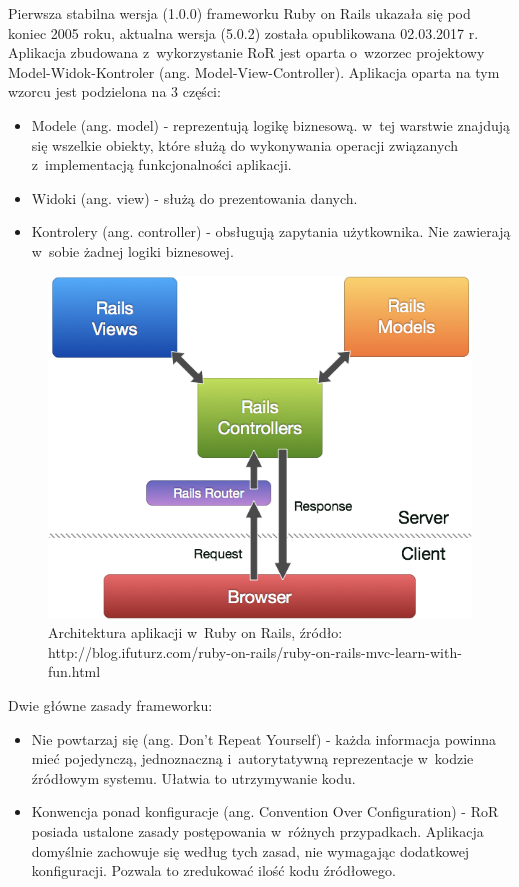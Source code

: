 \documentclass[printmode]{mgr}
\begin{document}
Pierwsza stabilna wersja (1.0.0) frameworku Ruby on Rails ukazała się pod koniec 2005 roku, aktualna wersja (5.0.2) została opublikowana 02.03.2017 r. Aplikacja zbudowana z~wykorzystanie RoR jest oparta o~wzorzec projektowy Model-Widok-Kontroler\cite{rails_agile} (ang. Model-View-Controller). Aplikacja oparta na tym wzorcu jest podzielona na 3 części:
\begin{itemize}
  \item Modele (ang. model) - reprezentują logikę biznesową. w~tej warstwie znajdują się wszelkie obiekty, które służą do wykonywania operacji związanych z~implementacją funkcjonalności aplikacji.
  \item Widoki (ang. view) - służą do prezentowania danych. 
  \item Kontrolery (ang. controller) - obsługują zapytania użytkownika. Nie zawierają w~sobie żadnej logiki biznesowej.
\end{itemize}

\begin{figure}[H]
  \centering
  \includegraphics[width=1\linewidth]{pictures/rails_mvc}
  \caption{Architektura aplikacji w~Ruby on Rails, źródło: http://blog.ifuturz.com/ruby-on-rails/ruby-on-rails-mvc-learn-with-fun.html}
  \label{fig:rails_mvc}
\end{figure}
\newpage
Dwie główne zasady frameworku\cite{doc_rails}:

\begin{itemize}
  \item Nie powtarzaj się (ang. Don't Repeat Yourself) - każda informacja powinna mieć pojedynczą, jednoznaczną i~autorytatywną reprezentacje w~kodzie źródłowym systemu. Ułatwia to utrzymywanie kodu.
  \item Konwencja ponad konfiguracje (ang. Convention Over Configuration) - RoR posiada ustalone zasady postępowania w~różnych przypadkach. Aplikacja domyślnie zachowuje się według tych zasad, nie wymagając dodatkowej konfiguracji. Pozwala to zredukować ilość kodu źródłowego.
\end{itemize}
\end{document}

